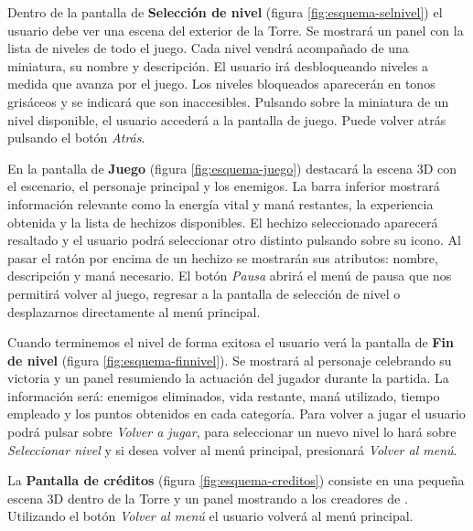 Dentro de la pantalla de \textbf{Selección de nivel} (figura \ref{fig:esquema-selnivel})
el usuario debe ver una escena del exterior de la Torre. Se mostrará un panel
con la lista de niveles de todo el juego. Cada nivel vendrá acompañado de una
miniatura, su nombre y descripción. El usuario irá desbloqueando niveles a medida
que avanza por el juego. Los niveles bloqueados aparecerán en tonos grisáceos
y se indicará que son inaccesibles. Pulsando sobre la miniatura de un nivel
disponible, el usuario accederá a la pantalla de juego. Puede volver atrás
pulsando el botón \emph{Atrás}.\\


En la pantalla de \textbf{Juego} (figura \ref{fig:esquema-juego}) destacará
la escena 3D con el escenario, el personaje principal y los enemigos.
La barra inferior mostrará información relevante como la energía vital y
maná restantes, la experiencia obtenida y la lista de hechizos disponibles.
El hechizo seleccionado aparecerá resaltado y el usuario podrá seleccionar
otro distinto pulsando sobre su icono. Al pasar el ratón por encima de
un hechizo se mostrarán sus atributos: nombre, descripción y maná necesario.
El botón \emph{Pausa} abrirá el menú de pausa que nos permitirá volver al
juego, regresar a la pantalla de selección de nivel o desplazarnos
directamente al menú principal.\\


Cuando terminemos el nivel de forma exitosa el usuario verá la pantalla de
\textbf{Fin de nivel} (figura \ref{fig:esquema-finnivel}). Se mostrará
al personaje celebrando su victoria y un panel resumiendo la actuación
del jugador durante la partida. La información será: enemigos eliminados,
vida restante, maná utilizado, tiempo empleado y los puntos obtenidos
en cada categoría. Para volver a jugar el usuario podrá pulsar sobre
\emph{Volver a jugar}, para seleccionar un nuevo nivel lo hará sobre
\emph{Seleccionar nivel} y si desea volver al menú principal, presionará
\emph{Volver al menú}.\\


La \textbf{Pantalla de créditos} (figura \ref{fig:esquema-creditos})
consiste en una pequeña escena 3D dentro de la Torre y un panel mostrando
a los creadores de \juego. Utilizando el botón \emph{Volver al menú} el
usuario volverá al menú principal.\\

